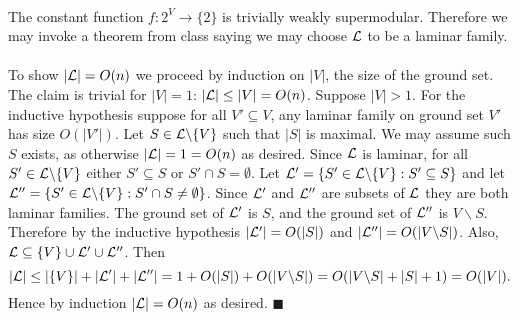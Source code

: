 \documentclass[letterpaper,12pt,oneside,onecolumn]{article}
\begin{document}
\paragraph{}
The constant function $f: 2^V \rightarrow \{2\}$ is trivially weakly supermodular. Therefore we may invoke a theorem from class saying we may choose $\mathcal{L}$ to be a laminar family.
\paragraph{}
To show $|\mathcal{L}| = O(n)$ we proceed by induction on $|V|$, the size of the ground set. The claim is trivial for $|V| = 1$: $|\mathcal{L}| \leq |V|  = O(n)$. Suppose $|V| >1$. For the inductive hypothesis suppose for all $V' \subseteq V$, any laminar family on ground set $V'$ has size $O(|V'|)$. Let $S \in \mathcal{L}\backslash\{V\}$ such that $|S|$ is maximal. We may assume such $S$ exists, as otherwise $|\mathcal{L}| = 1 = O(n)$ as desired. Since $\mathcal{L}$ is laminar, for all $S' \in \mathcal{L} \backslash \{V\}$ either $S' \subseteq S$ or $S' \cap S = \emptyset$. Let $\mathcal{L}' = \{ S' \in \mathcal{L}\backslash\{V\} : S' \subseteq S\}$ and let $\mathcal{L}'' = \{S' \in \mathcal{L}\backslash \{V\} : S'\cap S \neq \emptyset\}$. Since $\mathcal{L}'$ and $\mathcal{L}''$ are subsets of $\mathcal{L}$ they are both laminar families. The ground set of $\mathcal{L}'$ is $S$, and the ground set of $\mathcal{L}''$ is $V\backslash S$. Therefore by the inductive hypothesis $|\mathcal{L}'| = O(|S|)$ and $|\mathcal{L}''| = O(|V\backslash S|)$. Also, $\mathcal{L} \subseteq \{V\} \cup \mathcal{L}' \cup \mathcal{L}''$. Then 
$$|\mathcal{L}| \leq |\{V\}| + |\mathcal{L}'| + |\mathcal{L}''| = 1 + O(|S|) + O(|V\backslash S|) = O(|V\backslash S| + |S| + 1) = O(|V|).$$
Hence by induction $|\mathcal{L}| = O(n)$ as desired. $\blacksquare$
\end{document}
